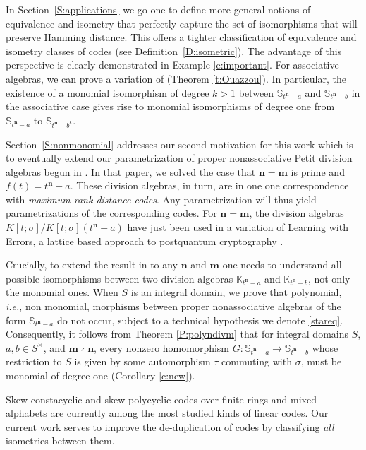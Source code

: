 \documentclass[11pt]{amsart}
\theoremstyle{plain}
\theoremstyle{definition}
\numberwithin{equation}{section}
\numberwithin{figure}{section}
\newcommand{\ring}{S}
\newcommand{\Kone}[1]{K[t;\sigma]/K[t;\sigma](t^{\de}-#1)}
\newcommand{\Konenew}[1]{\mathbb{K}_{t^\de-#1}}
\newcommand{\os}{\mathbf{m}}  %
\newcommand{\de}{\mathbf{n}}  %
\begin{document}
In Section~\ref{S:applications} we go one to define more general notions of equivalence and isometry that perfectly capture the set of isomorphisms that will preserve Hamming distance.  This offers a tighter classification of equivalence and isometry classes of codes (see Definition~\ref{D:isometric}).   The advantage of this perspective is clearly demonstrated in  Example \ref{e:important}.
For associative algebras, we can prove a variation of \cite[Theorem 4]{OuazzouNajmeddineAydin2025}  (Theorem \ref{t:Ouazzou}).
  In particular, the existence of a monomial isomorphism of degree $k>1$ between $\mathbb{S}_{t^\de-a}$ and $\mathbb{S}_{t^\de-b}$ 
  in the associative case gives rise to monomial isomorphisms of degree one from $\mathbb{S}_{t^\de-a}$ to $\mathbb{S}_{t^\de-b^k}$.
 


  Section~\ref{S:nonmonomial} addresses our second motivation for this work which is to eventually extend
our parametrization of proper nonassociative Petit division algebras begun in \cite{NevinsPumpluen2025}. In that paper, we solved the case that $\de=\os$ is prime and $f(t)=t^{\de}-a$.
 These division algebras, in turn, are in one one correspondence with \emph{maximum rank distance codes}.   Any parametrization will thus yield parametrizations of the corresponding codes. For $\de=\os$, the division algebras $\Kone{a}$ have just been used in a variation of Learning with Errors, a lattice based approach to postquantum cryptography  \cite{MendelsohnLing2025}.


Crucially, to extend the result in \cite{NevinsPumpluen2025} to any  $\de$ and $\os$ one needs to understand all possible isomorphisms between two division algebras $\Konenew{a}$ and $\Konenew{b}$, not only the monomial ones.
When $\ring$ is an integral domain, we prove that  polynomial, \emph{i.e.},  non monomial, morphisms between proper nonassociative algebras of the form $\mathbb{S}_{t^\de-a}$ 
do not occur, subject to a technical hypothesis we denote \eqref{stareq}.
Consequently, it follows from  Theorem  \ref{P:polyndivm} that for integral domains $\ring$, $a,b\in \ring^\times$, and $\os \nmid \de$, every nonzero homomorphism
 $G:\mathbb{S}_{t^\de-a}\to \mathbb{S}_{t^\de-b} 
 $  whose restriction to $\ring$ is given by some automorphism $\tau$ commuting with $\sigma$, must be monomial of degree one (Corollary \ref{c:new}).


Skew constacyclic and skew polycyclic codes over finite rings and mixed alphabets are currently among the most studied kinds of linear codes.
Our current work serves to improve the de-duplication of codes by classifying \emph{all} isometries between them.
\end{document}
